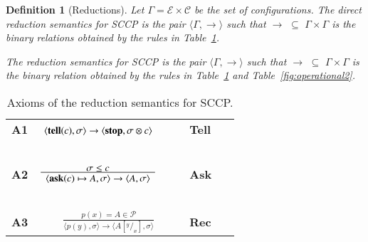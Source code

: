 \documentclass[preprint,12pt]{elsarticle}
\newtheorem{definition}{Definition}
\def\C{{\mathcal C}}
\newcommand{\tell}{{\bf tell}}
\newcommand{\ask}{{\bf ask}}
\newcommand{\ostop}{{\bf stop}}
\def\C{{\mathcal C}}
\def\odiv{\, {\ominus\hspace{-7.7pt} \div} \,}
\begin{document}
\begin{definition}[Reductions]\label{def:reductions}
	Let $\Gamma = {\mathcal E} \times \C$ be the set of \emph{configurations}.
	The \emph{direct reduction semantics} for SCCP is the pair 
	$\langle \Gamma,  \to \rangle$
	such that $\to \, \, \subseteq \, \,\Gamma \times   \Gamma$ is the 
	binary relations obtained by the rules in 
	Table~\ref{fig:operational}.
	
	The \emph{reduction semantics} for SCCP is the pair 
	$\langle \Gamma,  \rightarrow \rangle$
	such that $\rightarrow \, \, \subseteq \, \,\Gamma \times   \Gamma$ is the
	binary relation obtained by the rules in 
	Table~\ref{fig:operational} and Table~\ref{fig:operational2}.
\end{definition}


\begin{table}[t]  %
	\begin{center}
		\begin{tabular}{lcll} 
			\mbox{\bf A1}& $ {\displaystyle \langle \hbox{\tell}(c), \sigma \rangle \to \langle 
				\hbox{\ostop}, \sigma \otimes c\rangle}$
			\ \ \ & \bf{Tell}&
			\\ 
			&\mbox{   }&\mbox{   } &\mbox{   }
			\\
			\mbox{\bf A2}& $\frac {\displaystyle \sigma \leq c}{\displaystyle
				\begin{array}{l} \langle \hbox{\ask}(c) \mapsto A, \sigma \rangle \to \langle A, \sigma \rangle   	\end{array}}$
			\ \ \ & \bf{Ask}&
			\\
			&\mbox{   }&\mbox{   }&
			\\
			\mbox{\bf A3}& $\frac {\displaystyle p(x) = A \in \mathcal{P} }
			{\displaystyle\langle p(y),\sigma\rangle \to \langle A[^y/_x], \sigma \rangle}$ 
			&\bf{Rec}&
		\end{tabular}
	\end{center}
	\caption{Axioms of the reduction semantics for SCCP.}
	\label{fig:operational}
\end{table}
\end{document}
